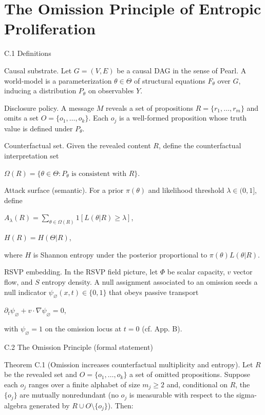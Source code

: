 \documentclass[11pt,a4paper]{article}
\begin{document}
\section{The Omission Principle of Entropic Proliferation}
\label{app:c}

C.1 Definitions

Causal substrate. Let $G = (V,E)$ be a causal DAG in the sense of Pearl. A world-model is a parameterization $\theta \in \Theta$ of structural equations $F_\theta$ over $G$, inducing a distribution $P_\theta$ on observables $Y$.

Disclosure policy. A message $M$ reveals a set of propositions $R = \{r_1, \dots, r_m\}$ and omits a set $O = \{o_1, \dots, o_k\}$. Each $o_j$ is a well-formed proposition whose truth value is defined under $P_\theta$.

Counterfactual set. Given the revealed content $R$, define the counterfactual interpretation set

$\Omega(R) = \{\theta \in \Theta : P_\theta \text{ is consistent with } R\}$.

Attack surface (semantic). For a prior $\pi(\theta)$ and likelihood threshold $\lambda \in (0,1]$, define

$A_\lambda(R) = \sum_{\theta \in \Omega(R)} 1 [ L(\theta | R) \geq \lambda ]$,

$H(R) = H(\Theta | R)$,

where $H$ is Shannon entropy under the posterior proportional to $\pi(\theta) L(\theta | R)$.

RSVP embedding. In the RSVP field picture, let $\Phi$ be scalar capacity, $v$ vector flow, and $S$ entropy density. A null assignment associated to an omission seeds a null indicator $\psi_\varnothing(x,t) \in \{0,1\}$ that obeys passive transport

$\partial_t \psi_\varnothing + v \cdot \nabla \psi_\varnothing = 0$,

with $\psi_\varnothing = 1$ on the omission locus at $t=0$ (cf. App. B).

C.2 The Omission Principle (formal statement)

Theorem C.1 (Omission increases counterfactual multiplicity and entropy).
Let $R$ be the revealed set and $O = \{o_1, \dots, o_k\}$ a set of omitted propositions. Suppose each $o_j$ ranges over a finite alphabet of size $m_j \geq 2$ and, conditional on $R$, the $\{o_j\}$ are mutually nonredundant (no $o_j$ is measurable with respect to the sigma-algebra generated by $R \cup O \setminus \{o_j\}$). Then:
\end{document}

